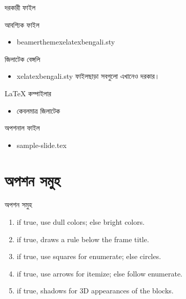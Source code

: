 \documentclass[xetex]{beamer}
\begin{document}
\begin{frame}{দরকারী ফাইল}
	\begin{alertblock}{আবশ্যিক ফাইল}
	\begin{itemize}
		\item {\rm beamerthemexelatexbengali.sty}
	\end{itemize}
	\end{alertblock}

	\begin{block}{জিলাটেক বেঙ্গলি}
	\begin{itemize}
		\item {\rm xelatexbengali.sty} ফাইলছাড়া সবগুলো এখানেও দরকার।
	\end{itemize}
	\end{block}

	\begin{block}{{\rm \LaTeX} কম্পাইলার}
	\begin{itemize}
		\item কেবলমাত্র {\rm \XeLaTeX} জিলাটেক
	\end{itemize}
	\end{block}

	\begin{exampleblock}{অপশনাল ফাইল}
	\begin{itemize}
		\item {\rm sample-slide.tex}
	\end{itemize}
	\end{exampleblock}

\end{frame}

\section{অপশন সমুহ}

\begin{frame}{অপশন সমুহ}
	\begin{small}	
	\begin{enumerate}
		\item \rm{ if true, use dull colors; else bright colors.}
		\item \rm{ if true, draws a rule below the frame title.} 
		\item \rm{ if true, use squares for enumerate; else circles.}
		\item \rm{ if true, use arrows for \alert{itemize}; else follow \alert{enumerate}.}
		\item \rm{ if true, shadows for 3D appearances of the blocks.}
	\end{enumerate}
	\end{small}
\end{frame}
\end{document}
